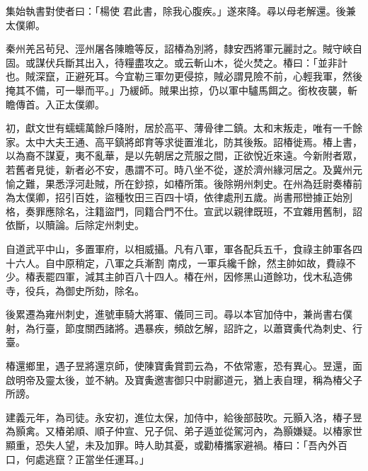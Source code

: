 \begin{pinyinscope}
 集始執書對使者曰：「楊使
 君此書，除我心腹疾。」遂來降。尋以母老解還。後兼太僕卿。



 秦州羌呂茍兒、涇州屠各陳瞻等反，詔椿為別將，隸安西將軍元麗討之。賊守峽自固。或謀伏兵斷其出入，待糧盡攻之。或云斬山木，從火焚之。椿曰：「並非計也。賊深竄，正避死耳。今宜勒三軍勿更侵掠，賊必謂見險不前，心輕我軍，然後掩其不備，可一舉而平。」乃緩師。賊果出掠，仍以軍中驢馬餌之。銜枚夜襲，斬瞻傳首。入正太僕卿。



 初，獻文世有蠕蠕萬餘戶降附，居於高平、薄骨律二鎮。太和末叛走，唯有一千餘家。太中大夫王通、高平鎮將郎育等求徙置淮北，防其後叛。詔椿徙焉。椿上書，
 以為裔不謀夏，夷不亂華，是以先朝居之荒服之間，正欲悅近來遠。今新附者眾，若舊者見徙，新者必不安，愚謂不可。時八坐不從，遂於濟州緣河居之。及冀州元愉之難，果悉浮河赴賊，所在鈔掠，如椿所策。後除朔州刺史。在州為廷尉奏椿前為太僕卿，招引百姓，盜種牧田三百四十頃，依律處刑五歲。尚書邢巒據正始別格，奏罪應除名，注籍盜門，同籍合門不仕。宣武以親律既班，不宜雜用舊制，詔依斷，以贖論。后除定州刺史。



 自道武平中山，多置軍府，以相威攝。凡有八軍，軍各配兵五千，食祿主帥軍各四十六人。自中原稍定，八軍之兵漸割
 南戍，一軍兵纔千餘，然主帥如故，費祿不少。椿表罷四軍，減其主帥百八十四人。椿在州，因修黑山道餘功，伐木私造佛寺，役兵，為御史所劾，除名。



 後累遷為雍州刺史，進號車騎大將軍、儀同三司。尋以本官加侍中，兼尚書右僕射，為行臺，節度關西諸將。遇暴疾，頻啟乞解，詔許之，以蕭寶夤代為刺史、行臺。



 椿還鄉里，遇子昱將還京師，使陳寶夤賞罰云為，不依常憲，恐有異心。昱還，面啟明帝及靈太後，並不納。及寶夤邀害御只中尉酈道元，猶上表自理，稱為椿父子所謗。



 建義元年，為司徒。永安初，進位太保，加侍中，給後部鼓吹。元顥入洛，椿子昱
 為顥禽。又椿弟順、順子仲宣、兄子侃、弟子遁並從駕河內，為顥嫌疑。以椿家世顯重，恐失人望，未及加罪。時人助其憂，或勸椿攜家避禍。椿曰：「吾內外百口，何處逃竄？正當坐任運耳。」




\end{pinyinscope}
